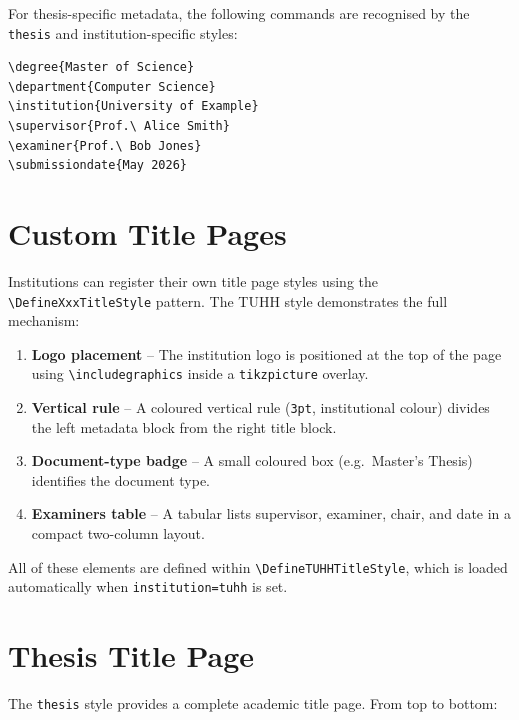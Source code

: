 For thesis-specific metadata, the following commands are recognised by the
\texttt{thesis} and institution-specific styles:

\begin{verbatim}
\degree{Master of Science}
\department{Computer Science}
\institution{University of Example}
\supervisor{Prof.\ Alice Smith}
\examiner{Prof.\ Bob Jones}
\submissiondate{May 2026}
\end{verbatim}

\section{Custom Title Pages}

Institutions can register their own title page styles using the
\texttt{\textbackslash DefineXxxTitleStyle} pattern.  The TUHH style
demonstrates the full mechanism:

\begin{enumerate}
  \item \textbf{Logo placement} -- The institution logo is positioned at
        the top of the page using \verb|\includegraphics| inside a
        \texttt{tikzpicture} overlay.
  \item \textbf{Vertical rule} -- A coloured vertical rule (\texttt{3pt},
        institutional colour) divides the left metadata block from the
        right title block.
  \item \textbf{Document-type badge} -- A small coloured box (e.g.\
        \textcolor{green!60!black}{\textsf{Master's Thesis}}) identifies the
        document type.
  \item \textbf{Examiners table} -- A tabular lists supervisor, examiner,
        chair, and date in a compact two-column layout.
\end{enumerate}

All of these elements are defined within
\texttt{\textbackslash DefineTUHHTitleStyle}, which is loaded
automatically when \texttt{institution=tuhh} is set.

\section{Thesis Title Page}

The \texttt{thesis} style provides a complete academic title page.  From
top to bottom:

